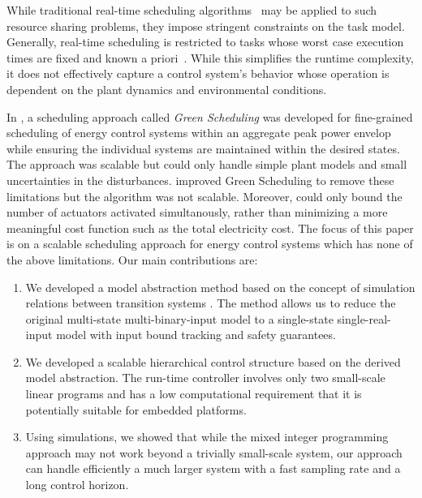 While traditional real-time scheduling algorithms~\cite{realtimesys} may be applied to such resource sharing problems, they impose stringent constraints on the task model.
Generally, real-time scheduling is restricted to tasks whose worst case execution times are fixed and known a priori~\cite{rts}.
While this simplifies the runtime complexity, %
it does not effectively capture a control system's behavior whose operation is dependent on the plant dynamics and environmental conditions. 

In \cite{nghiemetal12ssb}, a scheduling approach called \emph{Green Scheduling} was developed for fine-grained scheduling of energy control systems within an aggregate peak power envelop while ensuring the individual systems are maintained within the desired states.
The approach was scalable but could only handle simple plant models and small uncertainties in the disturbances.
\cite{nghiemetal13ebg} improved Green Scheduling to remove these limitations but the algorithm was not scalable.
Moreover, \cite{nghiemetal12ssb,nghiemetal13ebg} could only bound the number of actuators activated simultanously, rather than minimizing a more meaningful cost function such as the total electricity cost.
%
The focus of this paper is on a scalable %
scheduling approach for energy control systems which has none of the above limitations.
Our main contributions are:
\begin{enumerate}
\item We developed a model abstraction method based on the concept of simulation relations between transition systems \cite{aluretal00dah,girardetal07amd}.  The method allows us to reduce the original multi-state multi-binary-input model to a single-state single-real-input model with input bound tracking and safety guarantees.
\item We developed a scalable hierarchical control structure based on the derived model abstraction.  The run-time controller involves only two small-scale linear programs and has a low computational requirement that it is potentially suitable for embedded platforms.  
\item Using simulations, we showed that while the mixed integer programming approach \cite{sou2011scheduling,zhang2011optimal} may not work beyond a trivially small-scale system, our approach can handle efficiently a much larger system with a fast sampling rate and a long control horizon.
\end{enumerate}
 

